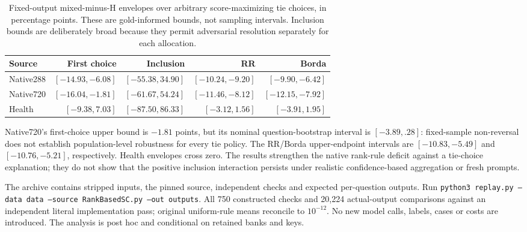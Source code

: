 \begin{table}[t]
\centering\small
\caption{Fixed-output mixed-minus-H envelopes over arbitrary score-maximizing tie choices, in percentage points. These are gold-informed bounds, not sampling intervals. Inclusion bounds are deliberately broad because they permit adversarial resolution separately for each allocation.}
\label{tab:tie_envelopes}
\begin{tabular}{lrrrr}
\toprule
Source & First choice & Inclusion & RR & Borda\\
\midrule
Native288 &$[-14.93,-6.08]$&$[-55.38,34.90]$&$[-10.24,-9.20]$&$[-9.90,-6.42]$\\
Native720 &$[-16.04,-1.81]$&$[-61.67,54.24]$&$[-11.46,-8.12]$&$[-12.15,-7.92]$\\
Health &$[-9.38,7.03]$&$[-87.50,86.33]$&$[-3.12,1.56]$&$[-3.91,1.95]$\\
\bottomrule
\end{tabular}
\end{table}

Native720's first-choice upper bound is $-1.81$ points, but its nominal question-bootstrap interval is $[-3.89,.28]$: fixed-sample non-reversal does not establish population-level robustness for every tie policy. The RR/Borda upper-endpoint intervals are $[-10.83,-5.49]$ and $[-10.76,-5.21]$, respectively. Health envelopes cross zero. The results strengthen the native rank-rule deficit against a tie-choice explanation; they do not show that the positive inclusion interaction persists under realistic confidence-based aggregation or fresh prompts.

The  archive contains stripped inputs, the pinned source, independent checks and expected per-question outputs. Run \texttt{python3 replay.py --data data --source RankBasedSC.py --out outputs}. All 750 constructed checks and 20,224 actual-output comparisons against an independent literal implementation pass; original uniform-rule means reconcile to $10^{-12}$. No new model calls, labels, cases or costs are introduced. The analysis is post hoc and conditional on retained banks and keys.
